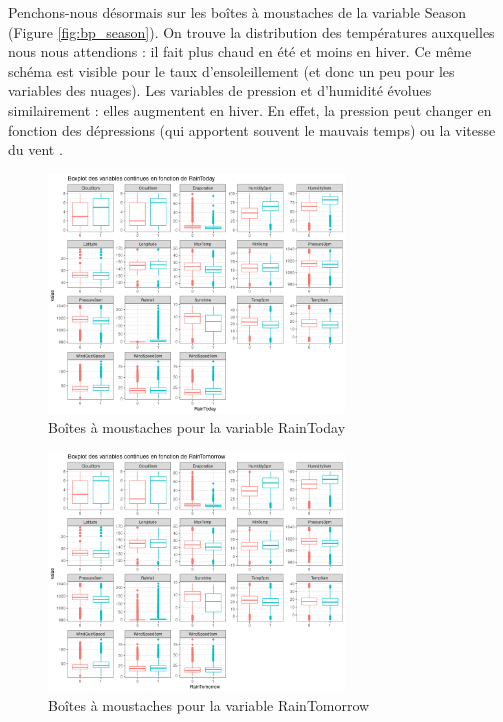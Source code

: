 \documentclass{article}
\begin{document}
Penchons-nous désormais sur les boîtes à moustaches de la variable Season (Figure \ref{fig:bp_season}). On trouve la distribution des températures auxquelles nous nous attendions : il fait plus chaud en été et moins en hiver. Ce même schéma est visible pour le taux d'ensoleillement (et donc un peu pour les variables des nuages). Les variables de pression et d'humidité évolues similairement : elles augmentent en hiver. En effet, la pression peut changer en fonction des dépressions (qui apportent souvent le mauvais temps) ou la vitesse du vent \cite{frwiki:190112465}.

\begin{figure}[htp]
    \centering
    \includegraphics[width=0.7\textwidth]{Images/boxplots/boxplot_RainToday.png}
    \caption{Boîtes à moustaches pour la variable RainToday}
    \label{fig:bp_raintoday}
\end{figure}

\begin{figure}[htp]
    \centering
    \includegraphics[width=0.7\textwidth]{Images/boxplots/boxplot_RainTomorrow.png}
    \caption{Boîtes à moustaches pour la variable RainTomorrow}
    \label{fig:bp_raintomorrow}
\end{figure}
\end{document}
